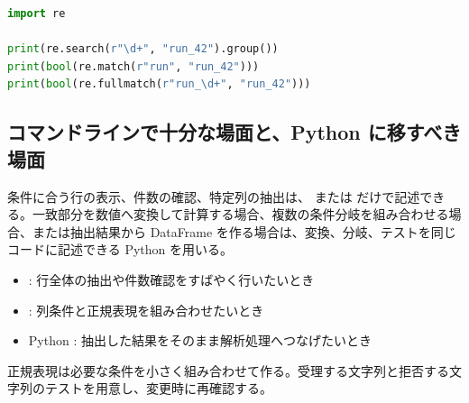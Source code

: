 \begin{lstlisting}[language=Python]
import re

print(re.search(r"\d+", "run_42").group())
print(bool(re.match(r"run", "run_42")))
print(bool(re.fullmatch(r"run_\d+", "run_42")))
\end{lstlisting}

\subsection{コマンドラインで十分な場面と、Python に移すべき場面}

条件に合う行の表示、件数の確認、特定列の抽出は、 または  だけで記述できる。一致部分を数値へ変換して計算する場合、複数の条件分岐を組み合わせる場合、または抽出結果から DataFrame を作る場合は、変換、分岐、テストを同じコードに記述できる Python を用いる。

\begin{itemize}
\item {}: 行全体の抽出や件数確認をすばやく行いたいとき
\item {}: 列条件と正規表現を組み合わせたいとき
\item Python : 抽出した結果をそのまま解析処理へつなげたいとき
\end{itemize}

正規表現は必要な条件を小さく組み合わせて作る。受理する文字列と拒否する文字列のテストを用意し、変更時に再確認する。
